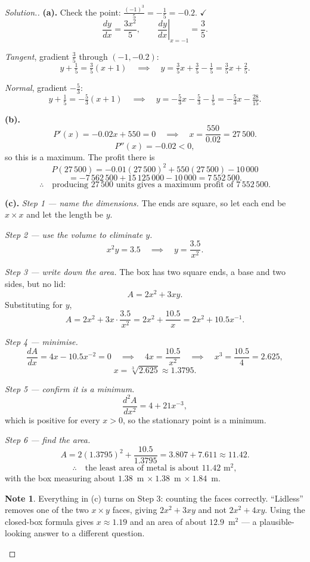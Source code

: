 \documentclass[11pt,a4paper]{article}
\theoremstyle{definition}
\newtheorem{note}[thm]{Note}
\newenvironment{solution}
  {\renewcommand{\qedsymbol}{}\begin{proof}[\textit{Solution}.]}
  {\end{proof}}
\let\amscheckmark\checkmark
\renewcommand{\checkmark}{\ensuremath{\amscheckmark}}
\begin{document}
\begin{solution}
\textbf{(a).} Check the point: $\frac{(-1)^3}{5}=-\frac{1}{5}=-0.2$. $\checkmark$
$$\frac{dy}{dx}=\frac{3x^2}{5},\qquad
\left.\frac{dy}{dx}\right|_{x=-1}=\frac{3}{5}.$$

\emph{Tangent}, gradient $\frac{3}{5}$ through $(-1,-0.2)$:
$$y+\tfrac{1}{5}=\tfrac{3}{5}(x+1)\quad\implies\quad y=\tfrac{3}{5}x+\tfrac{3}{5}
-\tfrac{1}{5}=\tfrac{3}{5}x+\tfrac{2}{5}.$$

\emph{Normal}, gradient $-\frac{5}{3}$:
$$y+\tfrac{1}{5}=-\tfrac{5}{3}(x+1)\quad\implies\quad
y=-\tfrac{5}{3}x-\tfrac{5}{3}-\tfrac{1}{5}=-\tfrac{5}{3}x-\tfrac{28}{15}.$$

\textbf{(b).}
$$P'(x)=-0.02x+550=0\quad\implies\quad x=\frac{550}{0.02}=27\,500.$$
$$P''(x)=-0.02<0,$$
so this is a maximum. The profit there is
$$P(27\,500)=-0.01(27\,500)^2+550(27\,500)-10\,000$$
$$=-7\,562\,500+15\,125\,000-10\,000=7\,552\,500.$$
$$\therefore\quad \text{producing } 27\,500 \text{ units gives a maximum profit of }
7\,552\,500.$$

\textbf{(c).} \emph{Step 1 --- name the dimensions.} The ends are square, so let each
end be $x\times x$ and let the length be $y$.

\emph{Step 2 --- use the volume to eliminate $y$.}
$$x^2y=3.5\quad\implies\quad y=\frac{3.5}{x^2}.$$

\emph{Step 3 --- write down the area.} The box has two square ends, a base and two
sides, but no lid:
$$A=2x^2+3xy.$$
Substituting for $y$,
$$A=2x^2+3x\cdot\frac{3.5}{x^2}=2x^2+\frac{10.5}{x}=2x^2+10.5x^{-1}.$$

\emph{Step 4 --- minimise.}
$$\frac{dA}{dx}=4x-10.5x^{-2}=0\quad\implies\quad 4x=\frac{10.5}{x^2}
\quad\implies\quad x^3=\frac{10.5}{4}=2.625,$$
$$x=\sqrt[3]{2.625}\approx 1.3795.$$

\emph{Step 5 --- confirm it is a minimum.}
$$\frac{d^2A}{dx^2}=4+21x^{-3},$$
which is positive for every $x>0$, so the stationary point is a minimum.

\emph{Step 6 --- find the area.}
$$A=2(1.3795)^2+\frac{10.5}{1.3795}=3.807+7.611\approx 11.42.$$
$$\therefore\quad \text{the least area of metal is about } 11.42\text{ m}^2,$$
with the box measuring about $1.38$~m $\times\ 1.38$~m $\times\ 1.84$~m.

\begin{note}
Everything in (c) turns on Step 3: counting the faces correctly. ``Lidless'' removes one
of the two $x\times y$ faces, giving $2x^2+3xy$ and not $2x^2+4xy$. Using the closed-box
formula gives $x\approx 1.19$ and an area of about $12.9$~m$^2$ --- a plausible-looking
answer to a different question.
\end{note}
\end{solution}
\end{document}

